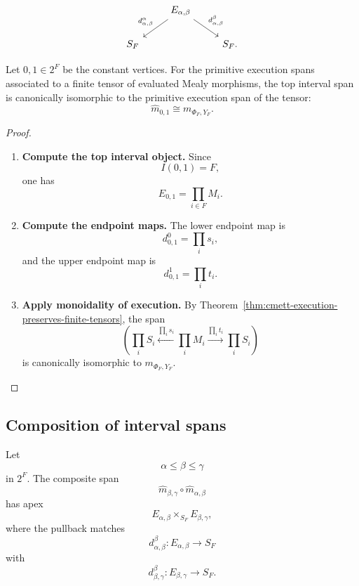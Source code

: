 \[
\begin{tikzcd}
&
E_{\alpha,\beta}
    \arrow[dl,"d_{\alpha,\beta}^{\alpha}"']
    \arrow[dr,"d_{\alpha,\beta}^{\beta}"]
&
\\
S_F
&&
S_F .
\end{tikzcd}
\]

\begin{theorem}
\label{thm:cmett-top-interval-is-tensor-execution}
    Let \(0,1\in 2^F\) be the constant vertices. For the primitive execution
    spans associated to a finite tensor of evaluated Mealy morphisms, the top
    interval span is canonically isomorphic to the primitive execution span of
    the tensor:
    \[
        \widehat m_{0,1}
        \cong
        m_{\Phi_F,Y_F}.
    \]
\end{theorem}

\begin{proof}
    \leavevmode
    \begin{enumerate}
        \item \textbf{Compute the top interval object.}
        Since
        \[
            I(0,1)=F,
        \]
        one has
        \[
            E_{0,1}=\prod_{i\in F}M_i.
        \]

        \item \textbf{Compute the endpoint maps.}
        The lower endpoint map is
        \[
            d_{0,1}^{0}=\prod_i s_i,
        \]
        and the upper endpoint map is
        \[
            d_{0,1}^{1}=\prod_i t_i.
        \]

        \item \textbf{Apply monoidality of execution.}
        By Theorem~\ref{thm:cmett-execution-preserves-finite-tensors}, the
        span
        \[
            \left(
                \prod_iS_i
                \xleftarrow{\prod_i s_i}
                \prod_iM_i
                \xrightarrow{\prod_i t_i}
                \prod_iS_i
            \right)
        \]
        is canonically isomorphic to \(m_{\Phi_F,Y_F}\).
    \end{enumerate}
\end{proof}

\subsection{Composition of interval spans}
\label{subsec:cmett-composition-interval-spans}

Let
\[
    \alpha\leq\beta\leq\gamma
\]
in \(2^F\). The composite span
\[
    \widehat m_{\beta,\gamma}\circ\widehat m_{\alpha,\beta}
\]
has apex
\[
    E_{\alpha,\beta}
    \times_{S_F}
    E_{\beta,\gamma},
\]
where the pullback matches
\[
    d_{\alpha,\beta}^{\beta}:E_{\alpha,\beta}\to S_F
\]
with
\[
    d_{\beta,\gamma}^{\beta}:E_{\beta,\gamma}\to S_F.
\]


